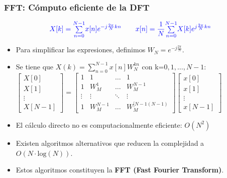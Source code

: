 \documentclass{beamer}
\numberwithin{section}{part}
\begin{document}
\begin{frame}
  \frametitle{FFT: Cómputo eficiente de la DFT}
  \footnotesize
  \[\color{blue}
    X[k]=\substack{N-1\\\sum\\n=0}x[n] e^{-j\frac{2\pi}{N}kn}
    \quad\quad
    x[n]=\frac{1}{N}\substack{N-1\\\sum\\n=0}X[k] e^{j\frac{2\pi}{N}kn}
  \]  
  \begin{itemize}
  \item Para simplificar las expresiones, definimos $W_N=e^{-j\frac{2\pi}{N}}$.
  \item Se tiene que $X(k)=\sum_{n=0}^{N-1}x[n]W_N^{kn}$ con k=${0,1,\dots,N-1}$:  
  {
  $\left [\begin{array}{l}X[0]\\X[1]\\\vdots\\X[N-1]\end{array}\right ]=\left [\begin{array}{cccc}1& 1 &\dots &1\\ 1 &W_M^{1}& \dots& W_M^{N-1}\\\vdots&\vdots&\ddots & \vdots\\1 & W_M^{N-1} & \dots & W_M^{[N-1(N-1)} \end{array}\right ]\left [\begin{array}{l}x[0]\\x[1]\\\vdots\\x[N-1]\end{array}\right ]$
  }
  \item El cálculo directo no es computacionalmente eficiente: $O(N^2)$  
  \item Existen algoritmos alternativos que reducen la complejidad a $O(N\cdot\text{log}(N))$.
  \item Estos algoritmos constituyen la \textbf{FFT (Fast Fourier Transform)}.
  \end{itemize}
\end{frame} 
  
\end{document}
